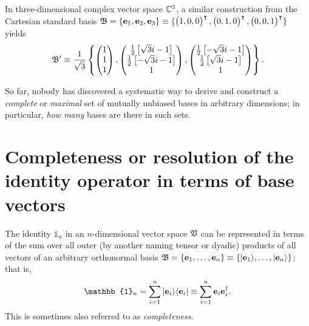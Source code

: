 {In three-dimensional complex vector space ${\Bbb C}^3$, a similar construction
from the Cartesian standard basis
${\frak B}=\{ {\bf e}_1 , {\bf e}_2, {\bf e}_3\} \equiv
\{\begin{pmatrix}1,0,0\end{pmatrix}^\intercal ,\begin{pmatrix}0,1,0\end{pmatrix}^\intercal ,\begin{pmatrix}0,0,1\end{pmatrix}^\intercal \}$
yields
\begin{equation}
\begin{split}
 {\frak B}' \equiv   \frac{1}{\sqrt{3}}  \left\{
 \begin{pmatrix}1\\1\\1\end{pmatrix},
 \begin{pmatrix}\frac{1}{2} \left[{\sqrt{3}} i-1\right] \\ \frac{1}{2} \left[-{\sqrt{3}} i-1\right] \\
  1\end{pmatrix},
\begin{pmatrix}
 \frac{1}{ 2} \left[-{\sqrt{3}} i-1\right]\\ \frac{1}{ 2} \left[{\sqrt{3}} i-1\right]\\1  \end{pmatrix}
   \right\} .
\end{split}
\end{equation}
\eexample
}

So far, nobody  has discovered a systematic way to derive and construct a {\em complete} or {\em maximal}
set of mutually unbiased bases in arbitrary dimensions; in particular,
{\em how many} bases are there in such sets.


\section{Completeness or resolution of the identity operator in terms of base vectors}
\label{2016-m-ch-fdvsrotio}

The identity $\mathbb{1}_n$ in an $n$-dimensional vector space ${\frak V}$ can be represented in terms of the sum
over all outer (by another naming tensor or dyadic) products
of all vectors of an arbitrary orthonormal basis
${\frak B} =\{
{\bf e}_1,
\ldots ,
{\bf e}_n
\}
\equiv
\{
\vert {\bf e}_1 \rangle ,
\ldots ,
\vert{\bf e}_n \rangle
\}
$; that is,
\begin{equation}
 \mathbb{1}_n = \sum_{i=1}^n \vert {\bf e}_i \rangle \langle {\bf e}_i \vert
\equiv  \sum_{i=1}^n {\bf e}_i  {\bf e}_i^\dagger  .
\label{2016-m-ch-fdlws-roi}
\end{equation}
This is sometimes also referred to as {\em completeness}.

